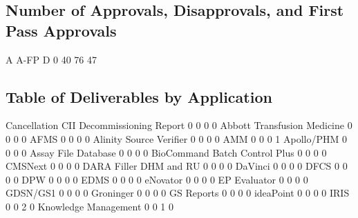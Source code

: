 \documentclass{article}
\begin{document}
\subsection{Number of Approvals, Disapprovals, and First Pass Approvals}

\begin{Schunk}
\begin{Soutput}
        A A-FP    D 
   0   40   76   47 
\end{Soutput}
\end{Schunk}

\subsection{Table of Deliverables by Application}
\begin{Schunk}
\begin{Soutput}
                                   Cancellation CII Decommissioning Report
                                 0            0   0                      0
  Abbott Transfusion Medicine    0            0   0                      0
  AFMS                           0            0   0                      0
  Alinity Source Verifier        0            0   0                      0
  AMM                            0            0   0                      1
  Apollo/PHM                     0            0   0                      0
  Assay File Database            0            0   0                      0
  BioCommand Batch Control Plus  0            0   0                      0
  CMSNext                        0            0   0                      0
  DARA Filler DHM and RU         0            0   0                      0
  DaVinci                        0            0   0                      0
  DFCS                           0            0   0                      0
  DPW                            0            0   0                      0
  EDMS                           0            0   0                      0
  eNovator                       0            0   0                      0
  EP Evaluator                   0            0   0                      0
  GDSN/GS1                       0            0   0                      0
  Groninger                      0            0   0                      0
  GS Reports                     0            0   0                      0
  ideaPoint                      0            0   0                      0
  IRIS                           0            0   2                      0
  Knowledge Management           0            0   1                      0

\end{Soutput}
\end{Schunk}
\end{document}
